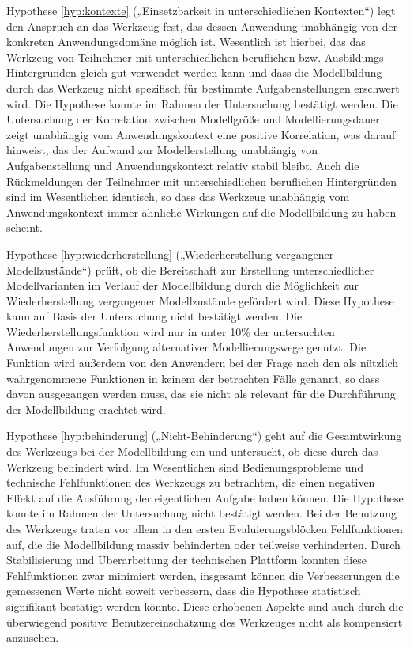 Hypothese \ref{hyp:kontexte} („Einsetzbarkeit in unterschiedlichen Kontexten“) legt den Anspruch an das Werkzeug fest, das dessen Anwendung unabhängig von der konkreten Anwendungsdomäne möglich ist. Wesentlich ist hierbei, das das Werkzeug von Teilnehmer mit unterschiedlichen beruflichen bzw. Ausbildungs-Hintergründen gleich gut verwendet werden kann und dass die Modellbildung durch das Werkzeug nicht spezifisch für bestimmte Aufgabenstellungen erschwert wird. Die Hypothese konnte im Rahmen der Untersuchung bestätigt werden. Die Untersuchung der Korrelation zwischen Modellgröße und Modellierungsdauer zeigt unabhängig vom Anwendungskontext eine positive Korrelation, was darauf hinweist, das der Aufwand zur Modellerstellung unabhängig von Aufgabenstellung und Anwendungskontext relativ stabil bleibt. Auch die Rückmeldungen der Teilnehmer mit unterschiedlichen beruflichen Hintergründen sind im Wesentlichen identisch, so dass das Werkzeug unabhängig vom Anwendungskontext immer ähnliche Wirkungen auf die Modellbildung zu haben scheint. 

Hypothese \ref{hyp:wiederherstellung} („Wiederherstellung vergangener Modellzustände“) prüft, ob die Bereitschaft zur Erstellung unterschiedlicher Modellvarianten im Verlauf der Modellbildung durch die Möglichkeit zur Wiederherstellung vergangener Modellzustände gefördert wird. Diese Hypothese kann auf Basis der Untersuchung nicht bestätigt werden. Die Wiederherstellungsfunktion wird nur in unter 10\% der untersuchten Anwendungen zur Verfolgung alternativer Modellierungswege genutzt. Die Funktion wird außerdem von den Anwendern bei der Frage nach den als nützlich wahrgenommene Funktionen in keinem der betrachten Fälle genannt, so dass davon ausgegangen werden muss, das sie nicht als relevant für die Durchführung der Modellbildung erachtet wird.

Hypothese \ref{hyp:behinderung} („Nicht-Behinderung“) geht auf die Gesamtwirkung des Werkzeugs bei der Modellbildung ein und untersucht, ob diese durch das Werkzeug behindert wird. Im Wesentlichen sind Bedienungsprobleme und technische Fehlfunktionen des Werkzeugs zu betrachten, die einen negativen Effekt auf die Ausführung der eigentlichen Aufgabe haben können. Die Hypothese konnte im Rahmen der Untersuchung nicht bestätigt werden. Bei der Benutzung des Werkzeugs traten vor allem in den ersten Evaluierungsblöcken Fehlfunktionen auf, die die Modellbildung massiv behinderten oder teilweise verhinderten. Durch Stabilisierung und Überarbeitung der technischen Plattform konnten diese Fehlfunktionen zwar minimiert werden, insgesamt können die Verbesserungen die gemessenen Werte nicht soweit verbessern, dass die Hypothese statistisch signifikant bestätigt werden könnte. Diese erhobenen Aspekte sind auch durch die überwiegend positive Benutzereinschätzung des Werkzeuges nicht als kompensiert anzusehen.

